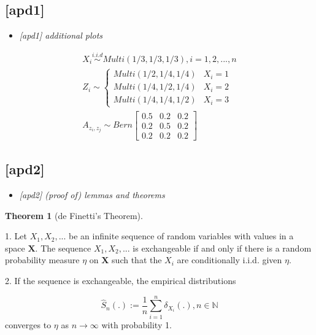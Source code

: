 \documentclass[12pt]{article}
\theoremstyle{definition}
\newtheorem{theorem}{Theorem}[section]
\begin{document}
\subsection{[apd1]}
\begin{itemize}
	\item {\it  [apd1] additional plots   \/}
\end{itemize}


\begin{equation}
\begin{gathered}
X_{i} \overset{i.i.d}{\sim} Multi(1/3, 1/3, 1/3), i = 1,2, ... , n \\ 
Z_{i}  \sim  \left\{  \begin{array}{ccc} Multi(1/2, 1/4, 1/4) & X_{i} = 1 \\ Multi(1/4, 1/2, 1/4) & X_{i} = 2 \\ Multi(1/4, 1/4, 1/2) & X_{i} = 3  \end{array} \right. \\
A_{z_{i}, z_{j}} \sim Bern \left[  \begin{array}{ccc}   0.5 & 0.2 &  0.2  \\ 0.2 & 0.5 & 0. 2  \\ 0.2 & 0.2 & 0.2  \end{array}  \right]
\end{gathered}
\end{equation}




\subsection{[apd2]}
\begin{itemize}
	\item {\it  [apd2] (proof of) lemmas and theorems   \/}
\end{itemize}


\begin{theorem}[de Finetti's Theorem] 
\label{finetti}

1. Let $X_{1}, X_{2}, ...$ be an infinite sequence of random variables with values in a space $\mathbf{X}$. The sequence $X_{1}, X_{2}, ...$ is exchangeable if and only if there is a random probability measure $\eta$ on $\mathbf{X}$ such that the $X_{i}$ are conditionally i.i.d. given $\eta$. 

2. If the sequence is exchangeable, the empirical distributions

$$\hat{S}_{n} ( . ) := \frac{1}{n} \sum\limits_{i=1}^{n} \delta_{X_{i}} ( .), n \in \mathbb{N}$$
converges to $\eta$ as $n \rightarrow \infty$ with probability 1.
\end{theorem}
\end{document}
